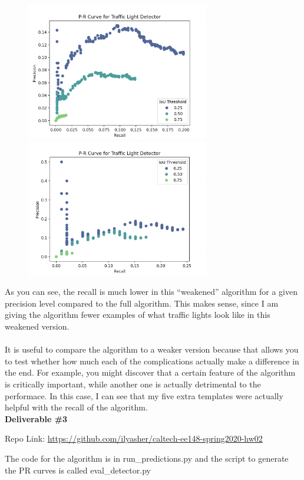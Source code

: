 \documentclass[12pt,letterpaper]{article} \usepackage{fullpage}
\begin{document}
\begin{figure}[htp]
    \centering
    \includegraphics[width=8cm]{img/pr-train-weak.png}
    \includegraphics[width=8cm]{img/pr-test-weak.png}
\end{figure}
As you can see, the recall is much lower in this ``weakened'' algorithm for a given
precision level compared to the full algorithm. This makes sense, since I am giving the
algorithm fewer examples of what traffic lights look like in this weakened version.
\\\\
It is useful to compare the algorithm to a weaker version because that allows you to test
whether how much each of the complications actually make a difference in the end. For example,
you might discover that a certain feature of the algorithm is critically important, while
another one is actually detrimental to the performace. In this case, I can see that my
five extra templates were actually helpful with the recall of the algorithm.\\


\textbf{Deliverable \#3}

Repo Link: \url{https://github.com/ilyasher/caltech-ee148-spring2020-hw02}

The code for the algorithm is in run\_predictions.py and the script
to generate the PR curves is called eval\_detector.py
\end{document}
